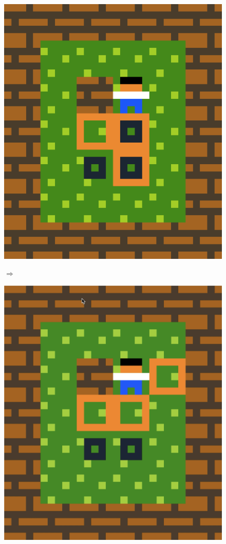 \begin{figure}[!htbp]
\centering
\begin{minipage}[t]{0.2\textwidth}
\includegraphics[width=\textwidth]{figures/sokobaniteratelevel.png} \hfill \\
\end{minipage}
$\Longrightarrow$
\begin{minipage}[t]{0.2\textwidth}
\includegraphics[width=\textwidth]{figures/maxii0.png} \hfill \\

\end{minipage}
\end{figure}
